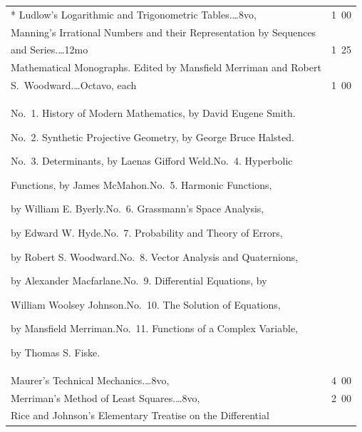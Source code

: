 \documentclass[a4paper,12pt]{book}[2004/02/16]
\theoremstyle{ilemma}
\theoremstyle{itheorem}
\theoremstyle{iother}
\theoremstyle{icorollary}
\theoremstyle{numcorollary}
\theoremstyle{idefinition}
\begin{document}
\begin{longtable}{@{}l@{ }r@{}}
* Ludlow's Logarithmic and Trigonometric Tables.\dotfill\ldots 8vo, &1\ 00\\

Manning's Irrational Numbers and their Representation by Sequences\\

\nopagebreak

\indent\indent and Series.\dotfill\ldots 12mo &1\ 25\\



Mathematical Monographs. Edited by Mansfield Merriman and Robert \\

\indent\indent S.~Woodward.\dotfill\ldots Octavo, each &1\ 00\\

\indent

\begin{minipage}{.8\textwidth}

No.~1. History of Modern Mathematics, by David Eugene Smith.\quad

No.~2. Synthetic Projective Geometry, by George Bruce Halsted.\quad

No.~3. Determinants, by Laenas Gifford Weld.\quad No.~4. Hyperbolic

Functions, by James McMahon.\quad No.~5. Harmonic Functions,

by William E. Byerly.\quad No.~6. Grassmann's Space Analysis,

by Edward W. Hyde.\quad No.~7. Probability and Theory of Errors,

by Robert S. Woodward.\quad No.~8. Vector Analysis and Quaternions,

by Alexander Macfarlane.\quad No.~9. Differential Equations, by

William Woolsey Johnson.\quad No.~10. The Solution of Equations,

by Mansfield Merriman.\quad No.~11. Functions of a Complex Variable,

by Thomas S. Fiske.

\end{minipage}\\

Maurer's Technical Mechanics.\dotfill\ldots 8vo, &4\ 00\\

Merriman's Method of Least Squares.\dotfill\ldots 8vo, &2\ 00\\

Rice and Johnson's Elementary Treatise on the Differential\\


\end{longtable}
\end{document}
